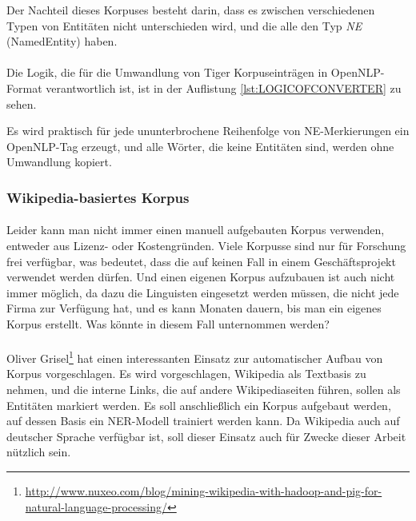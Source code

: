 Der Nachteil dieses Korpuses besteht darin, dass es zwischen verschiedenen Typen von Entitäten nicht unterschieden wird, und die alle den Typ \textit{NE} (NamedEntity) haben.

\paragraph{}
Die Logik, die für die Umwandlung von Tiger Korpuseinträgen in OpenNLP-Format verantwortlich ist, ist in der Auflistung \ref{lst:LOGICOFCONVERTER} zu sehen.

Es wird praktisch für jede ununterbrochene Reihenfolge von NE-Merkierungen ein OpenNLP-Tag erzeugt, und alle Wörter, die keine Entitäten sind, werden ohne Umwandlung kopiert.

\subsubsection{Wikipedia-basiertes Korpus}
\paragraph{}
Leider kann man nicht immer einen manuell aufgebauten Korpus verwenden, entweder aus Lizenz- oder Kostengründen. Viele Korpusse sind nur für Forschung frei verfügbar, was bedeutet, dass 
die auf keinen Fall in einem Geschäftsprojekt verwendet werden dürfen. Und einen eigenen Korpus aufzubauen ist auch nicht immer möglich, da dazu die Linguisten eingesetzt werden müssen, die nicht jede Firma zur Verfügung hat, und es kann Monaten dauern, bis man ein eigenes Korpus erstellt. Was könnte in diesem Fall unternommen werden?

\paragraph{}
Oliver Grisel\footnote{\url{http://www.nuxeo.com/blog/mining-wikipedia-with-hadoop-and-pig-for-natural-language-processing/}} hat einen interessanten Einsatz zur automatischer Aufbau von Korpus vorgeschlagen. Es wird vorgeschlagen, Wikipedia als Textbasis zu nehmen, und die interne Links, die auf andere Wikipediaseiten führen, sollen als  Entitäten markiert werden. Es soll anschließlich ein Korpus aufgebaut werden, auf dessen Basis ein NER-Modell trainiert werden kann. Da Wikipedia auch auf deutscher Sprache verfügbar ist, soll dieser Einsatz auch für Zwecke dieser Arbeit nützlich sein.

